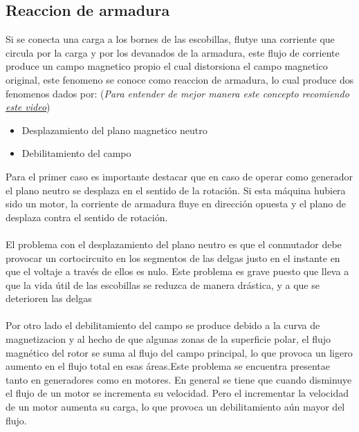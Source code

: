 \documentclass[
  11pt,
  letterpaper,
   addpoints,
   answers
  ]{exam}
\begin{document}
\subsection*{Reaccion de armadura}
Si se conecta una carga a los bornes de las escobillas, flutye una corriente que circula por la carga y por los devanados de la armadura, este flujo de corriente produce un campo magnetico propio el cual distorsiona el campo magnetico original, este fenomeno se conoce como reaccion de armadura, lo cual produce dos fenomenos dados por: (\textit{Para entender de mejor manera este concepto recomiendo \href{https://www.youtube.com/watch?v=R0cyZ052zJ0&t=161s}{este video}}) 
\begin{itemize}
  \item Desplazamiento del plano magnetico neutro
  \item Debilitamiento del campo
\end{itemize}
Para el primer caso es importante destacar que en caso de operar como generador el plano neutro se desplaza en el sentido de la rotación. Si esta máquina hubiera sido un motor, la corriente de armadura fluye en dirección opuesta y el plano de desplaza contra el sentido de rotación.\\\\
El problema con el desplazamiento del plano neutro es que el conmutador debe provocar un cortocircuito en los segmentos de las delgas justo en el instante en que el voltaje a través de ellos es nulo. Este problema es grave puesto que lleva a que la vida útil de las escobillas se reduzca de manera drástica, y a que se deterioren las delgas\\\\
Por otro lado el debilitamiento del campo se produce debido a la curva de magnetizacion y al hecho de que algunas zonas de la superficie polar, el flujo magnético del rotor se suma al flujo del campo principal, lo que provoca un ligero aumento en el flujo total en esas áreas.Este problema se encuentra presentae tanto en generadores como en motores.  En general se tiene que cuando disminuye el flujo de un motor se incrementa su velocidad. Pero el incrementar la velocidad de un motor aumenta su carga, lo que provoca un debilitamiento aún mayor del flujo. 
\end{document}
